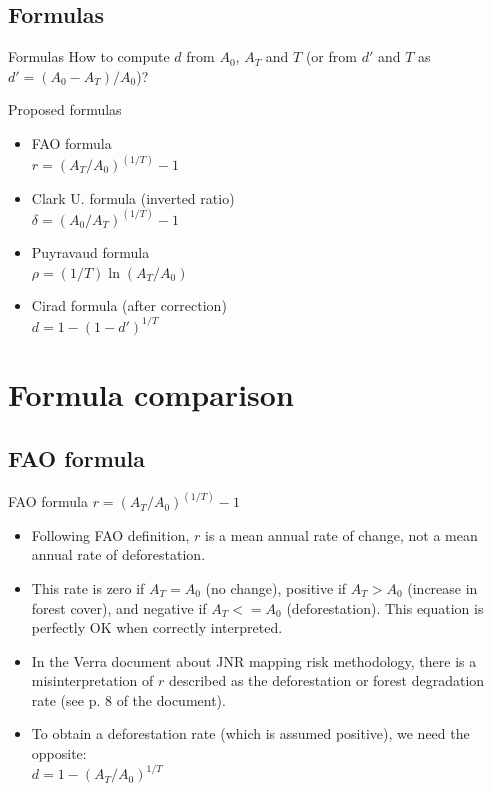 \documentclass[10pt,table,dvipsnames,compress]{beamer}
\begin{document}
\subsection{Formulas}
\label{sec:org78cfd2b}

\begin{frame}[label={sec:org457ce12}]{Formulas}
How to compute \(d\) from \(A_0\), \(A_T\) and \(T\) (or from \(d'\) and \(T\) as \(d' = (A_0-A_T)/A_0\))?

\begin{block}{Proposed formulas}
\begin{itemize}
\item FAO formula \\
\(r = (A_T/A_0)^{(1/T)}-1\)
\item Clark U. formula (inverted ratio) \\
\(\delta = (A_0/A_T)^{(1/T)}-1\) \\
\item Puyravaud formula \\
\(\rho = (1/T) \ln(A_T/A_0)\)
\item Cirad formula (after correction)\\
\(d = 1 - (1 - d')^{1/T}\)
\end{itemize}
\end{block}
\end{frame}

\section{Formula comparison}
\label{sec:org2810e74}

\subsection{FAO formula}
\label{sec:org681db88}

\begin{frame}[label={sec:orgaaab85b}]{FAO formula}
\centering \alert{\alert{\(r = (A_T/A_0)^{(1/T)}-1\)}}
\vspace{0.5cm}

\begin{itemize}
\item Following FAO definition, \(r\) is a mean \alert{\alert{annual rate of change}}, not a mean annual rate of \alert{\alert{deforestation}}.
\item This rate is zero if \(A_T = A_0\) (no change), positive if \(A_T > A_0\) (increase in forest cover), and negative if \(A_T <= A_0\) (deforestation). This equation is perfectly OK when correctly interpreted.
\item In the Verra document about JNR mapping risk methodology, there is a misinterpretation of \(r\) described as the deforestation or forest degradation rate (see p. 8 of the document).
\item To obtain a deforestation rate (which is assumed positive), we need the opposite:\\
\(d = 1 - (A_T/A_0)^{1/T}\)
\end{itemize}
\end{frame}
\end{document}
